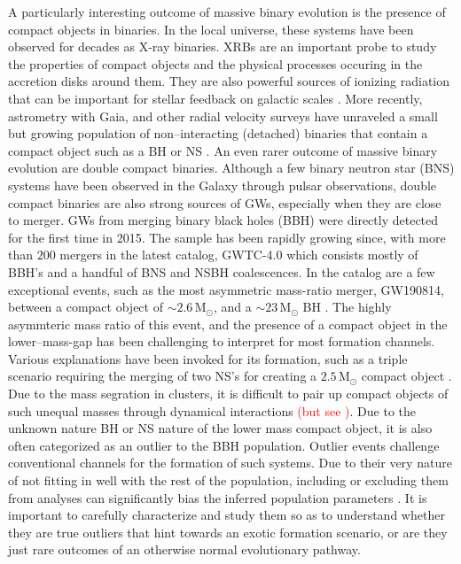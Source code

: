 \documentclass[linenumbers,trackchanges,twocolumn]{aastex701}
\newcommand{\Mdot}{\mathrm{M}_{\odot}}
\newcommand{\red}{\textcolor{red}}
\begin{document}
A particularly interesting outcome of massive binary evolution is the presence of compact objects in binaries. In the local universe, these systems have been observed for decades as X-ray binaries. XRBs are an important probe to study the properties of compact objects and the physical processes occuring in the accretion disks around them. They are also powerful sources of ionizing radiation that can be important for stellar feedback on galactic scales \citep{2012MNRAS.423.1641J}. More recently, astrometry with Gaia, and other radial velocity surveys have unraveled a small but growing population of non--interacting (detached) binaries that contain a compact object such as a BH \citep{2023MNRAS.518.1057E,2023MNRAS.521.4323E,2024A&A...686L...2G} or NS \citep{2024OJAp....7E..58E}. An even rarer outcome of massive binary evolution are double compact binaries. Although a few binary neutron star (BNS) systems have been observed in the Galaxy through pulsar observations, double compact binaries are also strong sources of GWs, especially when they are close to merger. GWs from merging binary black holes (BBH) were directly detected for the first time in 2015. The sample has been rapidly growing since, with more than $200$ mergers in the latest catalog, GWTC-4.0 \citep{2025arXiv250818082T,2025arXiv250818083T} which consists mostly of BBH's and a handful of BNS and NSBH coalescences. In the catalog are a few exceptional events, such as the most asymmetric mass-ratio merger, GW190814, between a compact object of $\sim 2.6\,\Mdot$, and a $\sim 23\,\Mdot$ BH \citep{2020ApJ...896L..44A}. The highly asymmteric mass ratio of this event, and the presence of a compact object in the lower--mass-gap has been challenging to interpret for most formation channels. Various explanations have been invoked for its formation, such as a triple scenario requiring the merging of two NS's for creating a $2.5\,\Mdot$ compact object \citep{2021MNRAS.500.1817L}. Due to the mass segration in clusters, it is difficult to pair up compact objects of such unequal masses through dynamical interactions \red{(but see \citep{2021ApJ...908L..38A})}. Due to the unknown nature BH or NS nature of the lower mass compact object, it is also often categorized as an outlier to the BBH population. Outlier events challenge conventional channels for the formation of such systems. Due to their very nature of not fitting in well with the rest of the population, including or excluding them from analyses can significantly bias the inferred population parameters \citep{2025arXiv250814159C,2021ApJ...913L...7A,2022ApJ...926...34E,2022ApJ...931..108F}. It is important to carefully characterize and study them so as to understand whether they are true outliers that hint towards an exotic formation scenario, or are they just rare outcomes of an otherwise normal evolutionary pathway. 
\end{document}
